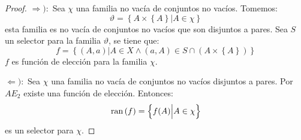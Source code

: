 \documentclass[12pt]{report}
\theoremstyle{largebreak}
\newcommand\ran[1]{\ensuremath{\textup{ran}\left(#1\right)}}
\begin{document}
    \begin{proof}
        $\Rightarrow):$ Sea $\chi$ una familia no vacía de conjuntos no vacíos. Tomemos:
        \begin{equation*}
            \vartheta=\left\{A\times\left\{A\right\}\Big|A\in\chi \right\}
        \end{equation*}
        esta familia es no vacía de conjuntos no vacíos que son disjuntos a pares. Sea $S$ un selector para la familia $\vartheta$, se tiene que:
        \begin{equation*}
            f=\left\{(A,a)\Big|A\in X\land (a,A)\in S\cap(A\times\left\{A\right\}) \right\}
        \end{equation*}
        $f$ es función de elección para la familia $\chi$.
        
        $\Leftarrow):$ Sea $\chi$ una familia no vacía de conjuntos no vacíos disjuntos a pares. Por $AE_2$ existe una función de elección. Entonces:
        \begin{equation*}
            \ran{f}=\left\{f(A)\Big|A\in\chi \right\}
        \end{equation*} 
        es un selector para $\chi$.
    \end{proof}
\end{document}
